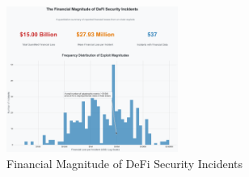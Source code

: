 \begin{figure}[H]
\centering
\includegraphics[width=0.5\textwidth]{../figure/methodology/fig4.png}
\caption{Financial Magnitude of DeFi Security Incidents}
\label{fig:data_pipeline}
\end{figure}
